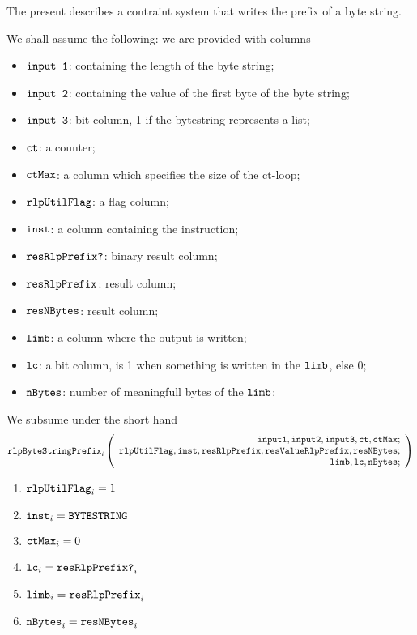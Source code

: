 The present describes a contraint system that writes the \rlp{} prefix of a byte string.

We shall assume the following: we are provided with columns
\begin{itemize}
    \item $\texttt{input 1}$: containing the length of the byte string;
    \item $\texttt{input 2}$: containing the value of the first byte of the byte string;
    \item $\texttt{input 3}$: bit column, 1 if the bytestring represents a list;
    \item $\texttt{ct}$: a counter;
    \item $\texttt{ctMax}$: a column which specifies the size of the ct-loop;

    \item $\texttt{rlpUtilFlag}$: a flag column;
    \item $\texttt{inst}$: a column containing the instruction;
    \item $\texttt{resRlpPrefix?}$: binary result column;
    \item $\texttt{resRlpPrefix}$: result column;
    \item $\texttt{resNBytes}$: result column;
    
    \item $\texttt{limb}$: a column where the output is written;
    \item $\texttt{lc}$: a bit column, is 1 when something is written in the $\texttt{limb}$, else 0;
    \item $\texttt{nBytes}$: number of meaningfull bytes of the $\texttt{limb}$;
\end{itemize}

\noindent We subsume under the short hand
\[
    \texttt{rlpByteStringPrefix}_{i}
    \left(
	\begin{array}{r}
    \texttt{input1},
    \texttt{input2},
    \texttt{input3},
    \texttt{ct},
    \texttt{ctMax}; \\
    \texttt{rlpUtilFlag},
    \texttt{inst},
    \texttt{resRlpPrefix},
    \texttt{resValueRlpPrefix},
    \texttt{resNBytes}; \\
    \texttt{limb},
    \texttt{lc},
    \texttt{nBytes}; \\
    \end{array}
	\right)
\]

\begin{enumerate}
    \item $\texttt{rlpUtilFlag}_{i} = 1$
    \item $\texttt{inst}_{i}        = \texttt{BYTESTRING}$
    \item $\texttt{ctMax}_{i}       = 0$

    \item $\texttt{lc}_{i}     = \texttt{resRlpPrefix?}_{i}$
    \item $\texttt{limb}_{i}   = \texttt{resRlpPrefix}_{i}$
    \item $\texttt{nBytes}_{i} = \texttt{resNBytes}_{i}$
\end{enumerate}
